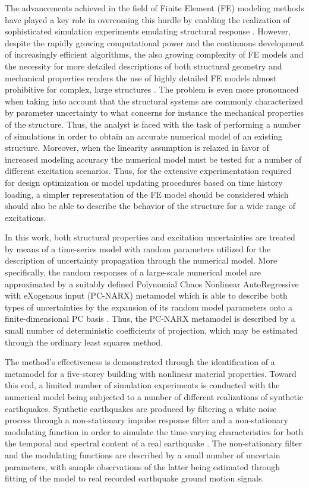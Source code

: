 \documentclass[12pt,a4paper,twocolumn,fleqn]{narms}
\begin{document}
The advancements achieved in the field of Finite Element (FE) modeling methods have played a key role in overcoming this hurdle by enabling the realization of sophisticated simulation experiments emulating structural response \cite{Bathe2009}. However, despite the rapidly growing computational power and the continuous development of increasingly efficient algorithms, the also growing complexity of FE models and the necessity for more detailed descriptions of both structural geometry and mechanical properties renders the use of highly detailed FE models almost prohibitive for complex, large structures \cite{Gholizadeh-Salajegheh2009}. The problem is even more pronounced when taking into account that the structural systems are commonly characterized by parameter uncertainty to what concerns for instance the mechanical properties of the structure. Thus, the analyst is faced with the task of performing a number of simulations in order to obtain an accurate numerical model of an existing structure. Moreover, when the linearity assumption is relaxed in favor of increased modeling accuracy the numerical model must be tested for a number of different excitation scenarios. Thus, for the extensive experimentation required for design optimization or model updating procedures based on time history loading, a simpler representation of the FE model should be considered which should also be able to describe the behavior of the structure for a wide range of excitations. 

In this work, both structural properties and excitation uncertainties are treated by means of a time-series model with random parameters utilized for the description of uncertainty propagation through the numerical model. More specifically, the random responses of a large-scale numerical model are approximated by a suitably defined Polynomial Chaos Nonlinear AutoRegressive with eXogenous input (PC-NARX) metamodel which is able to describe both types of uncertainties by the expansion of its random model parameters onto a finite-dimensional PC basis \cite{Spiridonakos-Chatzi2012,Blatman-Sudret2010}. Thus, the PC-NARX metamodel is described by a small number of deterministic coefficients of projection, which may be estimated through the ordinary least squares method.

The method's effectiveness is demonstrated through the identification of a metamodel for a five-storey building with nonlinear material properties. Toward this end, a limited number of simulation experiments is conducted with the numerical model being subjected to a number of different realizations of synthetic earthquakes. Synthetic earthquakes are produced by filtering a white noise process through a non-stationary impulse response filter and a non-stationary modulating function in order to simulate the time-varying characteristics for both the temporal and spectral content of a real earthquake \cite{Rezaeian-Kiureghian2010}. The non-stationary filter and the modulating functions are described by a small number of uncertain parameters, with sample observations of the latter being estimated through fitting of the model to real recorded earthquake ground motion signals. 
\end{document}
